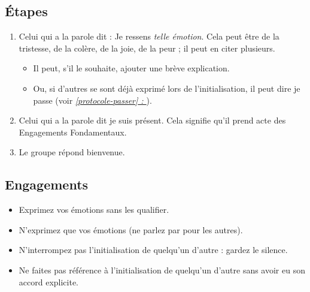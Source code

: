 \documentclass{book}
\newcommand*{\fullref}[1]{\textit{\hyperref[{#1}]{\autoref*{#1} : \nameref*{#1}}}}
\begin{document}
\subsection{Étapes}
\begin{enumerate}
	\item Celui qui a la parole dit : \og{}Je ressens \emph{telle émotion}\fg{}. Cela peut être de la tristesse, de la colère, de la joie, de la peur ;
	      il peut en citer plusieurs. 
	      \begin{itemize}
	      	\item Il peut, s'il le souhaite, ajouter une brève explication.
	      	\item Ou, si d'autres se sont déjà exprimé lors de l'initialisation, il peut dire \og{}je passe\fg{} (voir \fullref{protocole-passer}). 
	      \end{itemize}
	\item Celui qui a la parole dit \og{}je suis présent\fg{}. Cela signifie qu'il prend acte des Engagements Fondamentaux. 
	\item Le groupe répond \og{}bienvenue\fg{}. 
\end{enumerate}

\subsection{Engagements}
\begin{itemize}
	\item Exprimez vos émotions sans les qualifier.
	\item N'exprimez que vos émotions (ne parlez par pour les autres).
	\item N'interrompez pas l'initialisation de quelqu'un d'autre : gardez le silence.
	\item Ne faites pas référence à l'initialisation de quelqu'un d'autre sans avoir eu son accord explicite.
\end{itemize}
\end{document}
